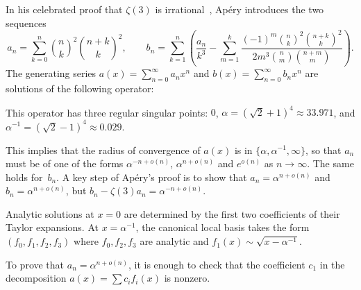 \documentclass[runningheads,a4paper]{llncs}
\begin{document}
\begin{example}
  In his celebrated proof that $\zeta (3)$ is irrational~\cite{Apery1979}, Apéry introduces
  the two sequences
  \[ a_n = \sum_{k = 0}^n \binom{n}{k}^2  \binom{n + k}{k}^2, \hspace{2em} b_n
     = \sum_{k = 1}^n \left( \frac{a_n}{k^3} - \sum_{m = 1}^k \frac{(- 1)^m
     \binom{n}{k}^2  \binom{n + k}{k}^2}{2 m^3  \binom{n}{m}  \binom{n +
     m}{m}} \right) . \]
  The generating series $a (x) = \sum_{n = 0}^{\infty} a_n x^n$ and $b (x) =
  \sum_{n = 0}^{\infty} b_n x^n$ are solutions of the following operator:
  
  
  This operator has three regular singular points: $0$, $\alpha = (\sqrt{2}
  + 1)^4 \approx 33.971$, and $\alpha^{- 1} = (\sqrt{2} - 1)^4 \approx
  0.029$.
  
  
  {\noindent}This implies that the radius of convergence of $a (x)$ is in $\{
  \alpha, \alpha^{- 1}, \infty \}$, so that $a_n$ must be of one of the forms $\alpha^{- n
  + o (n)}$, $\alpha^{n + o (n)}$ and $e^{o (n)}$ as $n \rightarrow
  \infty$. The same holds for~$b_n$. A key step of Apéry's proof is to show
  that $a_n = \alpha^{n + o (n)}$ and $b_n = \alpha^{n + o (n)}$, but $b_n -
  \zeta (3) a_n = \alpha^{- n + o (n)}$.
  
  Analytic solutions at $x = 0$ are determined by the first two coefficients
  of their Taylor expansions. At $x = \alpha^{- 1}$, the canonical local basis takes the form $(f_0,
  f_1, f_2, f_3)$ where $f_0, f_2, f_3$ are analytic and
  $f_1 (x) \sim \sqrt{x - \alpha^{- 1}}$.
  
  
  {\noindent}To prove that $a_n = \alpha^{n + o (n)}$, it is enough to check
  that the coefficient $c_1$ in the decomposition $a (x) = \sum c_i f_i (x)$
  is nonzero.
  

\end{example}
\end{document}
